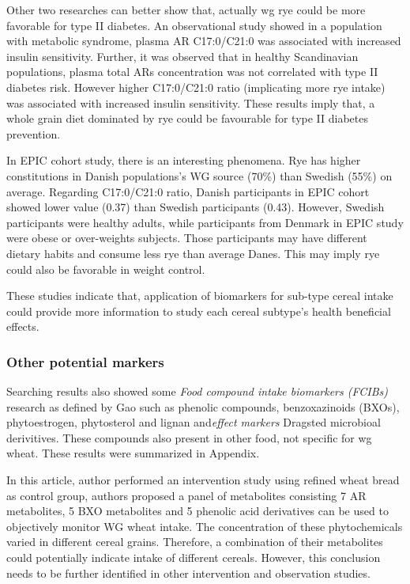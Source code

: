 Other two researches can better show that, actually \acrshort{wg} rye could be more favorable for type II diabetes.  An observational study showed in a population with metabolic syndrome, plasma AR C17:0/C21:0 was associated with increased insulin sensitivity\cite{ISI:000333777700008}. Further, it was observed that in healthy Scandinavian populations, plasma total ARs concentration was not correlated with type II diabetes risk. However higher C17:0/C21:0 ratio (implicating more rye intake) was associated with increased insulin sensitivity\cite{ISI:000378977200013}. These results imply that, a whole grain diet dominated by rye could be favourable for type II diabetes prevention. 

In EPIC cohort study\cite{ISI:000334172400017}, there is an interesting phenomena. Rye has higher constitutions in Danish populations's WG source (70\%) than Swedish (55\%) on average. Regarding C17:0/C21:0 ratio, Danish participants in EPIC cohort showed lower value (0.37) than Swedish participants (0.43). 
However, Swedish participants were healthy adults, while participants from Denmark in EPIC study were obese or over-weights subjects. Those participants may have different dietary habits and consume less rye than average Danes. This may imply rye could also be favorable in weight control.

These studies indicate that, application of biomarkers for sub-type cereal intake could provide more information to study each cereal subtype's health beneficial effects.

\subsubsection{Other potential markers}
Searching results also showed some \textit{Food compound intake biomarkers (FCIBs)} research as defined by Gao\cite{Gao2017} such as phenolic compounds\cite{ISI:000389134200003}, benzoxazinoids (BXOs)\cite{ISI:000394168100034,ISI:000348343300015}, phytoestrogen\cite{ISI:000384082300001}, phytosterol and lignan\cite{ISI:000387249200001} and\textit{effect markers} Dragsted\cite{Dragsted2017} microbioal derivitives\cite{ISI:000348343300015}. These compounds also present in other food,  not specific for \acrshort{wg} wheat. These results were summarized in Appendix.

In this article\cite{ISI:000387249200001}, author performed an intervention study using refined wheat bread as control group, authors proposed a panel of metabolites consisting 7 AR metabolites, 5 BXO metabolites and 5 phenolic acid derivatives can be used to objectively monitor WG wheat intake. The concentration of these phytochemicals varied in different cereal grains. Therefore, a combination of their metabolites could potentially indicate intake of different cereals. However, this conclusion needs to be further identified in other intervention and observation studies.


